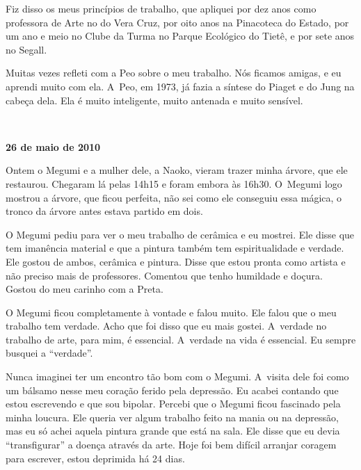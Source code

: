 Fiz disso os meus princípios de trabalho, que apliquei por dez anos como
professora de Arte no   do Vera Cruz, por oito anos na Pinacoteca
do Estado, por um ano e meio no Clube da Turma no Parque Ecológico do
Tietê, e por sete anos no Segall.

Muitas vezes refleti com a Peo sobre o meu trabalho. Nós ficamos amigas,
e eu aprendi muito com ela. A~Peo, em 1973, já fazia a síntese do Piaget
e do Jung na cabeça dela. Ela é muito inteligente, muito antenada e
muito sensível.

\begin{center}\asterisc{}​\end{center}


\begin{flushright}\textbf{26 de maio de 2010}\end{flushright}


Ontem o Megumi e a mulher dele, a Naoko, vieram trazer minha árvore, que
ele restaurou. Chegaram lá pelas 14h15 e foram embora às 16h30. O~Megumi
logo mostrou a árvore, que ficou perfeita, não sei como ele conseguiu
essa mágica, o tronco da árvore antes estava partido em dois.

O Megumi pediu para ver o meu trabalho de cerâmica e eu mostrei. Ele
disse que tem imanência material e que a pintura também tem
espiritualidade e verdade. Ele gostou de ambos, cerâmica e pintura.
Disse que estou pronta como artista e não preciso mais de professores.
Comentou que tenho humildade e doçura. Gostou do meu carinho com a
Preta.

O Megumi ficou completamente à vontade e falou muito. Ele falou que o
meu trabalho tem verdade. Acho que foi disso que eu mais gostei. A~verdade no trabalho de arte, para mim, é essencial. A~verdade na vida é
essencial. Eu sempre busquei a ``verdade''.

Nunca imaginei ter um encontro tão bom com o Megumi. A~visita dele foi
como um bálsamo nesse meu coração ferido pela depressão. Eu acabei
contando que estou escrevendo e que sou bipolar. Percebi que o Megumi
ficou fascinado pela minha loucura. Ele queria ver algum trabalho feito
na mania ou na depressão, mas eu só achei aquela pintura grande que está
na sala. Ele disse que eu devia ``transfigurar'' a doença através da
arte. Hoje foi bem difícil arranjar coragem para escrever, estou
deprimida há 24 dias.

\begin{center}\asterisc{}​\end{center}


